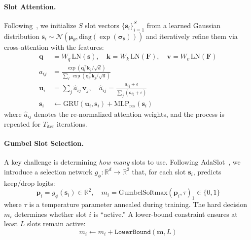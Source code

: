\documentclass{article}
\newcommand{\R}{\mathbb{R}}
\begin{document}
\paragraph{Slot Attention.}
Following~\citet{locatello2020object}, we initialize $S$ slot vectors $\{\mathbf{s}_i\}_{i=1}^{S}$ from a learned Gaussian distribution $\mathbf{s}_i \sim \mathcal{N}(\boldsymbol{\mu}_\theta, \text{diag}(\exp(\boldsymbol{\sigma}_\theta)))$ and iteratively refine them via cross-attention with the features:
\begin{align}
    \mathbf{q} &= W_q \, \text{LN}(\mathbf{s}), \quad \mathbf{k} = W_k \, \text{LN}(\mathbf{F}), \quad \mathbf{v} = W_v \, \text{LN}(\mathbf{F}) \label{eq:slot_qkv} \\
    a_{ij} &= \frac{\exp(\mathbf{q}_i^\top \mathbf{k}_j / \sqrt{d})}{\sum_{i'} \exp(\mathbf{q}_{i'}^\top \mathbf{k}_j / \sqrt{d})} \label{eq:slot_attn} \\
    \mathbf{u}_i &= \sum_j \hat{a}_{ij} \, \mathbf{v}_j, \quad \hat{a}_{ij} = \frac{a_{ij} + \epsilon}{\sum_j (a_{ij} + \epsilon)} \label{eq:slot_update} \\
    \mathbf{s}_i &\leftarrow \text{GRU}(\mathbf{u}_i, \mathbf{s}_i) + \text{MLP}_\text{res}(\mathbf{s}_i) \label{eq:slot_gru}
\end{align}
where $\hat{a}_{ij}$ denotes the re-normalized attention weights, and the process is repeated for $T_\text{iter}$ iterations.

\paragraph{Gumbel Slot Selection.}
A key challenge is determining \textit{how many} slots to use. Following AdaSlot~\citep{fan2024adaptive}, we introduce a selection network $g_\phi: \R^d \to \R^2$ that, for each slot $\mathbf{s}_i$, predicts keep/drop logits:
\begin{equation}
    \mathbf{p}_i = g_\phi(\mathbf{s}_i) \in \R^2, \quad
    m_i = \text{GumbelSoftmax}(\mathbf{p}_i, \tau)_1 \in \{0,1\}
    \label{eq:gumbel}
\end{equation}
where $\tau$ is a temperature parameter annealed during training. The hard decision $m_i$ determines whether slot $i$ is ``active.'' A lower-bound constraint ensures at least $L$ slots remain active:
\begin{equation}
    m_i \leftarrow m_i + \texttt{LowerBound}(\mathbf{m}, L)
\end{equation}
\end{document}
